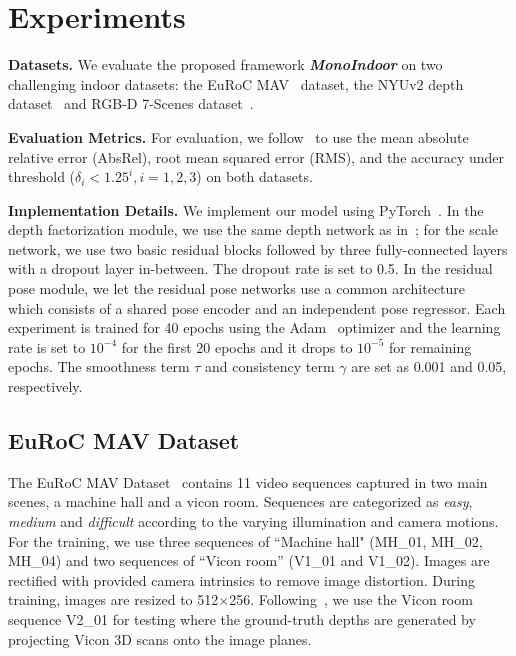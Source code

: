 \section{Experiments}

\noindent\textbf{Datasets.} We evaluate the proposed framework \textbf{\textit{MonoIndoor}} on two challenging indoor datasets: the EuRoC MAV~\cite{schonberger2016structure} dataset, the NYUv2 depth dataset~\cite{Silberman:ECCV12} and RGB-D 7-Scenes dataset~\cite{Shotton_2013_CVPR}. 

\noindent\textbf{Evaluation Metrics.} For evaluation, we follow~\cite{eigen2014depth} to use the mean absolute relative error (AbsRel), root mean squared error (RMS), and the accuracy under threshold ($\delta_{i}<1.25^{i}, i=1,2,3$) on both datasets.

\noindent\textbf{Implementation Details.} We implement our model using PyTorch~\cite{NEURIPS2019_9015}. In the depth factorization module, we use the same depth network as in~\cite{godard2019digging}; for the scale network, we use two basic residual blocks followed by three fully-connected layers with a dropout layer in-between. The dropout rate is set to 0.5. In the residual pose module, we let the residual pose networks use a common architecture~\cite{godard2019digging} which consists of a shared pose encoder and an independent pose regressor.  Each experiment is trained for 40 epochs using the Adam~\cite{kingma2015adam} optimizer and the learning rate is set to $10^{-4}$ for the first 20 epochs and it drops to $10^{-5}$ for remaining epochs. The smoothness term $\tau$ and consistency term $\gamma$ are set as 0.001 and 0.05, respectively.

\subsection{EuRoC MAV Dataset}
The EuRoC MAV Dataset~\cite{schonberger2016structure} contains 11 video sequences captured in two main scenes, a machine hall and a vicon room. Sequences are categorized as \textit{easy}, \textit{medium} and \textit{difficult} according to the varying illumination and camera motions.
For the training, we use three sequences of ``Machine hall" (MH\_01, MH\_02, MH\_04) and two sequences of ``Vicon room'' (V1\_01 and V1\_02). Images are rectified with provided camera intrinsics to remove image distortion. During training, images are resized to 512$\times$256. Following~\cite{gordon2019depth}, we use the Vicon room sequence V2\_01 for testing where the ground-truth depths are generated by projecting Vicon 3D scans onto the image planes.

